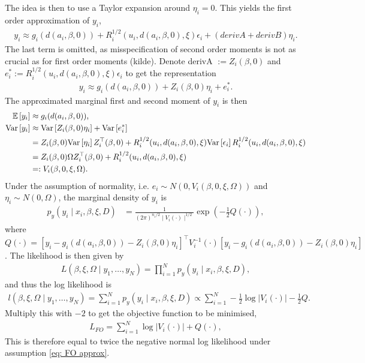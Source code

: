 The idea is then to use a Taylor expansion around $\eta_i=0$. This yields the first order approximation of $y_i$,
\begin{align}
    y_i \approx g_i(d(a_i,\beta,0)) + R_i^{1/2}(u_i,d(a_i,\beta,0),\xi)\epsilon_i + (derivA + derivB)\eta_i. \label{eq: FO approx}
\end{align}
The last term is omitted, as misspecification of second order moments is not as crucial as for first order moments (kilde). Denote derivA $:= Z_i(\beta,0)$ and $e_i^{\ast}:= R_i^{1/2}(u_i,d(a_i,\beta,0),\xi)\epsilon_i$ to get the representation 
\begin{align*}
       y_i \approx g_i(d(a_i,\beta,0)) + Z_i(\beta,0)\eta_i + e_i^{\ast}. 
\end{align*}
The approximated marginal first and second moment of $y_i$ is then
\begin{align*}
    \mathbb{E}\left[{y_i}\right] &\approx g_i(d(a_i,\beta,0)),\\
    \text{Var}\left[{y_i}\right] &\approx \text{Var}\left[{Z_i(\beta,0)\eta_i}\right] + \text{Var}\left[{e_i^{\ast}}\right]\\
    &= Z_i(\beta,0)\text{Var}\left[{\eta_i}\right]Z_i^{\top}(\beta,0) + R_i^{1/2}(u_i,d(a_i,\beta,0),\xi)\text{Var}\left[{\epsilon_i}\right]R_i^{1/2}(u_i,d(a_i,\beta,0),\xi)\\
    &=  Z_i(\beta,0)\Omega Z_i^{\top}(\beta,0) + R_i^{1/2}(u_i,d(a_i,\beta,0),\xi)\\
    &=:V_i(\beta,0,\xi,\Omega).
\end{align*}
Under the assumption of normality, i.e. $e_i \sim N(0,V_i(\beta,0,\xi,\Omega))$ and $\eta_i \sim N(0,\Omega)$, the marginal density of $y_i$ is
\begin{align*}
        p_{y}(y_i\mid x_i,\beta,\xi,D) &= \frac{1}{(2\pi)^{n_i/2}\mid V_i(\cdot)\mid ^{1/2}}\exp{\left(-\frac{1}{2}Q(\cdot)\right)},
\end{align*}
where $Q(\cdot)=\left[y_i-g_i(d(a_i,\beta,0))-Z_i(\beta,0)\eta_i\right]^\top V_i^{-1}(\cdot)\left[y_i-g_i(d(a_i,\beta,0))-Z_i(\beta,0)\eta_i\right]$. The likelihood is then given by
\begin{align*}
    L(\beta,\xi,\Omega \mid y_1,\dots,y_N)=\prod_{i=1}^N p_{y}(y_i\mid x_i,\beta,\xi,D),
\end{align*}
and thus the log likelihood is
\begin{align*}
    l(\beta,\xi,\Omega \mid y_1,\dots,y_N)=\sum_{i=1}^N p_{y}(y_i\mid x_i,\beta,\xi,D) \propto \sum_{i=1}^N-\frac{1}{2}\log|V_i(\cdot)|-\frac{1}{2}Q.
\end{align*}
Multiply this with $-2$ to get the objective function to be minimised,
\begin{align*}
L_{FO}=\sum_{i=1}^N\log|V_i(\cdot)|+Q(\cdot),
\end{align*}
This is therefore equal to twice the negative normal log likelihood under assumption \eqref{eq: FO approx}.

